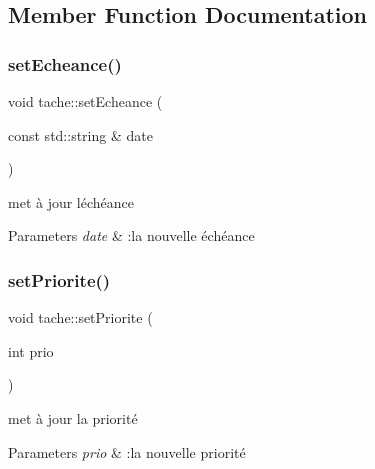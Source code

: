 \subsection{Member Function Documentation}
\mbox{\label{classtache_adaea7e42b4e6fc8f8903152300968e26}} 
\subsubsection{\texorpdfstring{set\+Echeance()}{setEcheance()}}
{\footnotesize\ttfamily void tache\+::set\+Echeance (\begin{DoxyParamCaption}\item[{const std\+::string \&}]{date }\end{DoxyParamCaption})\hspace{0.3cm}{\ttfamily [inline]}}



met à jour l\textquotesingle{}échéance 


\begin{DoxyParams}{Parameters}
{\em date} & \+:la nouvelle échéance \\
\hline
\end{DoxyParams}
\mbox{\label{classtache_a35292bd0bec7a172bf3c70ca3a441153}} 
\subsubsection{\texorpdfstring{set\+Priorite()}{setPriorite()}}
{\footnotesize\ttfamily void tache\+::set\+Priorite (\begin{DoxyParamCaption}\item[{int}]{prio }\end{DoxyParamCaption})\hspace{0.3cm}{\ttfamily [inline]}}



met à jour la priorité 


\begin{DoxyParams}{Parameters}
{\em prio} & \+:la nouvelle priorité \\
\hline
\end{DoxyParams}
\mbox{\label{classtache_afd4cda07440e36dc0f47079b110d022e}} 
